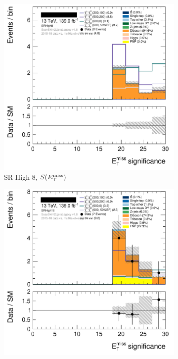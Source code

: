 \begin{figure}[tp]
\centering
\begin{subfigure}{0.48\textwidth}
\centering
\includegraphics[width=\textwidth]{figures/2ljets_def_met_Sign_SRHigh8.png}
\caption{SR-High-8, $S(E_\mathrm{T}^\mathrm{miss})$}
\end{subfigure}
\hfill
\begin{subfigure}{0.48\textwidth}
\centering
\includegraphics[width=\textwidth]{figures/2ljets_def_met_Sign_SRHigh16.png}

\end{subfigure}
\end{figure}
